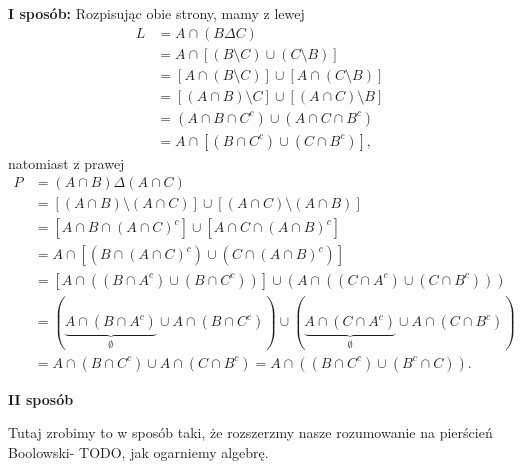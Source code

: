 \begin{solution}
\begin{enumerate}[label=A\arabic*.]
		\noindent \textbf{I sposób:
		} 
		Rozpisując obie strony, mamy z lewej
       \begin{align*}
	       L &= A\cap \left( B\Delta C \right) \\
		 &= A \cap \left[ \left(B\setminus C\right) \cup \left(C\setminus B\right) \right] \\ 
		 &= \left[ A\cap \left(B\setminus C\right) \right] \cup \left[ A\cap \left(C\setminus B\right) \right] \\
		 &= \left[ \left(A \cap B\right)\setminus C \right] \cup \left[ \left( A\cap C \right)\setminus B  \right] \\
		 &= \left(A \cap B \cap C^{c} \right) \cup \left(A \cap C \cap B^{c}\right) \\
		 &= A \cap \left[ \left(B\cap C ^{c}\right) \cup \left(C\cap B^{c}\right) \right]
       ,\end{align*}
       natomiast z prawej 
       \begin{align*}
	       P &= \left( A\cap B \right) \Delta \left( A\cap C \right) \\ 
		 &= \left[ \left(A\cap B\right) \setminus \left(A\cap C\right) \right] \cup \left[ \left(A\cap C\right) \setminus \left(A\cap B\right)  \right] \\
		 &=\left[ A\cap B \cap \left(A\cap C\right)^{c} \right] \cup \left[ A\cap C \cap \left(A\cap B\right)^{c} \right] \\
		 &= A\cap \left[ (B\cap (A\cap C)^{c}) \cup  (C \cap (A\cap B)^{c}) \right] \\ 
		 &= \left[A \cap \left( (B \cap A^{c}) \cup (B \cap C ^{c}) \right) \right] \cup \left(A \cap \left( (C \cap A^{c}) \cup (C \cap B^{c}) \right) \right) \\
		 &=\left(\underbrace{A \cap (B \cap A^{c})}_{\emptyset } \cup A \cap (B \cap C ^{c}) \right) \cup \left(\underbrace{A \cap (C \cap A^{c})}_{\emptyset } \cup A \cap (C \cap B^{c}) \right) \\
		 &= A \cap (B \cap C ^{c}) \cup A \cap (C \cap B^{c}) = A \cap \left( (B \cap C ^{c})\cup (B^{c} \cap C)   \right)
       .\end{align*}
\end{enumerate}

\noindent \textbf{II sposób}

\begin{remark}
	Tutaj zrobimy to w sposób taki, że rozszerzmy nasze rozumowanie na pierścień Boolowski- TODO, jak ogarniemy algebrę.
\end{remark} 
\end{solution} 
